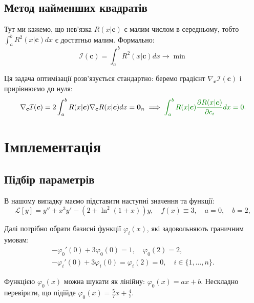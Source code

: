 \documentclass[14pt]{extarticle}
\begin{document}
\subsection{Метод найменших квадратів}

Тут ми кажемо, що нев'язка $R(x|\boldsymbol{c})$ є малим числом в середньому, тобто
$\int_a^b R^2(x|\boldsymbol{c})dx$ є достатньо малим. Формально:
\begin{equation*}
    \mathcal{I}(\boldsymbol{c}) = \int_a^b R^2(x|\boldsymbol{c})dx \to \min
\end{equation*}

Ця задача оптимізації розв'язується стандартно: беремо градієнт
$\nabla_{\boldsymbol{c}} \mathcal{I}(\boldsymbol{c})$ і прирівнюємо до нуля:
\begin{equation*}
    \nabla_{\boldsymbol{c}} \mathcal{I}(\boldsymbol{c}) = 2\int_a^b R(x|\boldsymbol{c})\nabla_{\boldsymbol{c}}R(x|\boldsymbol{c})dx = \boldsymbol{0}_n \implies \textcolor{green!50!black}{\int_a^b R(x|\boldsymbol{c})\frac{\partial R(x|\boldsymbol{c})}{\partial c_i}dx = 0.}
\end{equation*}

\newpage

\section{Імплементація}
\label{sec:attached-pdf}

\subsection{Підбір параметрів}

В нашому випадку маємо підставити наступні значення та функції:
\begin{equation*}
    \mathcal{L}[y] = y'' + x^3y' - (2+\ln^2(1+x))y, \quad f(x) \equiv 3, \quad a=0, \quad b=2,
\end{equation*} 

Далі потрібно обрати базисні функції $\varphi_i(x)$, які задовольняють
граничним умовам:
\begin{gather*}
    -\varphi_0'(0) + 3\varphi_0(0) = 1, \quad \varphi_0(2) = 2, \\
    -\varphi_i'(0) + 3\varphi_i(0) = \varphi_i(2) = 0, \quad i \in \{1,\dots,n\}.
\end{gather*}

Функцією $\varphi_0(x)$ можна шукати як лінійну: $\varphi_0(x) = ax+b$. 
Нескладно перевірити, що підійде $\varphi_0(x) = \frac{5}{7}x + \frac{4}{7}$.
\end{document}
